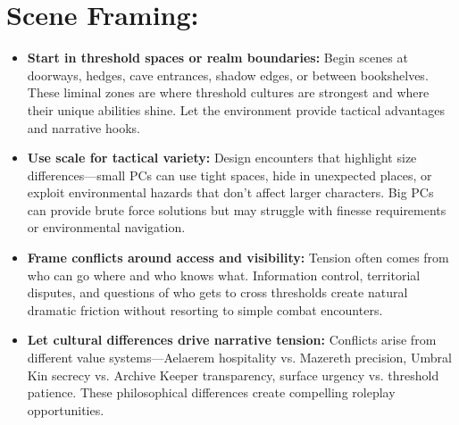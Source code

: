 \documentclass[11pt]{book}
\begin{document}
\section*{Scene Framing:}
\begin{itemize}[leftmargin=*]
\item \textbf{Start in threshold spaces or realm boundaries:} Begin scenes at doorways, hedges, cave entrances, shadow edges, or between bookshelves. These liminal zones are where threshold cultures are strongest and where their unique abilities shine. Let the environment provide tactical advantages and narrative hooks.
\item \textbf{Use scale for tactical variety:} Design encounters that highlight size differences---small PCs can use tight spaces, hide in unexpected places, or exploit environmental hazards that don't affect larger characters. Big PCs can provide brute force solutions but may struggle with finesse requirements or environmental navigation.
\item \textbf{Frame conflicts around access and visibility:} Tension often comes from who can go where and who knows what. Information control, territorial disputes, and questions of who gets to cross thresholds create natural dramatic friction without resorting to simple combat encounters.
\item \textbf{Let cultural differences drive narrative tension:} Conflicts arise from different value systems---Aelaerem hospitality vs. Mazereth precision, Umbral Kin secrecy vs. Archive Keeper transparency, surface urgency vs. threshold patience. These philosophical differences create compelling roleplay opportunities.
\end{itemize}
\end{document}
